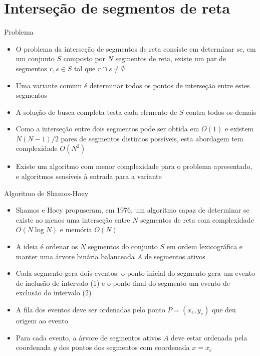 \section{Interseção de segmentos de reta}

\begin{frame}[fragile]{Problema}

    \begin{itemize}
        \item O problema da interseção de segmentos de reta consiste em determinar se, em um 
            conjunto $S$ composto por $N$ segmentos de reta, existe um par de segmentos 
            $r,s \in S$ tal que $r\cap s \neq \emptyset$

        \item Uma variante comum é determinar todos os pontos de interseção entre estes
            segmentos

        \item A solução de busca completa testa cada elemento de $S$ contra todos os demais

        \item Como a interseção entre dois segmentos pode ser obtida em $O(1)$ e existem
            $N(N - 1)/2$ pares de segmentos distintos possíveis, esta abordagem tem
            complexidade $O(N^2)$

        \item Existe um algoritmo com menor complexidade para o problema apresentado, e algoritmos 
            sensíveis à entrada para a variante
    \end{itemize}

\end{frame}

\begin{frame}[fragile]{Algoritmo de Shamos-Hoey}

    \begin{itemize}
        \item Shamos e Hoey propuseram, em 1976, um algoritmo capaz de determinar se existe ao
            menos uma interseção entre $N$ segmentos de reta com complexidade $O(N\log N)$ e
            memória $O(N)$

        \item A ideia é ordenar os $N$ segmentos do conjunto $S$ em ordem lexicográfica e manter
            uma árvore binária balanceada $A$ de segmentos ativos

        \item Cada segmento gera dois eventos: o ponto inicial do segmento gera um evento de 
            inclusão de intervalo (1) e o ponto final do segmento um evento de exclusão do 
            intervalo (2)

        \item A fila dos eventos deve ser ordenadas pelo ponto $P = (x_e, y_e)$ que deu origem 
            ao evento

        \item Para cada evento, a árvore de segmentos ativos $A$ deve estar ordenada pela 
            coordenada $y$ dos pontos dos segmentos com coordenada $x = x_e$ 
    \end{itemize}

\end{frame}
